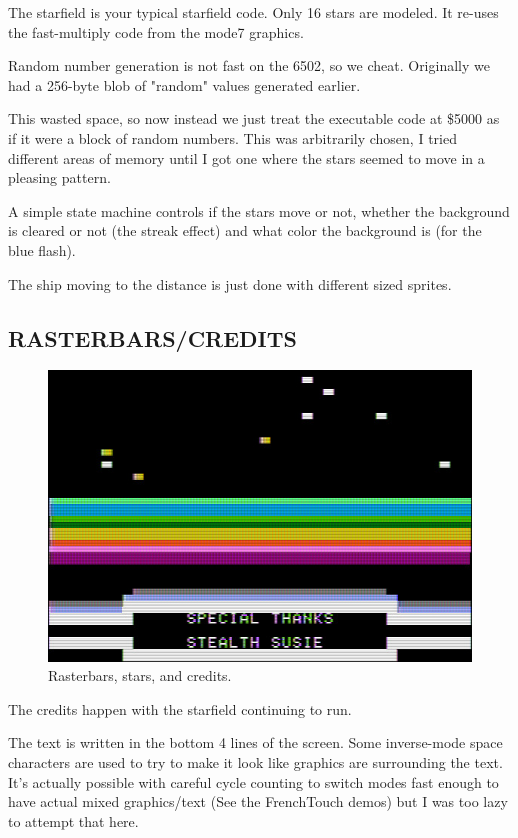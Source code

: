 \documentclass[twocolumn]{article}
\begin{document}
  The starfield is your typical starfield code.  Only 16 stars are modeled.
  It re-uses the fast-multiply code from the mode7 graphics.

  Random number generation is not fast on the 6502, so we cheat.
  Originally we had a 256-byte blob of "random" values generated earlier.

  This wasted space, so now instead we just treat the executable code
  at \$5000 as if it were a block of random numbers.  This was arbitrarily
  chosen, I tried different areas of memory until I got one where the
  stars seemed to move in a pleasing pattern.

  A simple state machine controls if the stars move or not, whether the
  background is cleared or not (the streak effect) and what color the
  background is (for the blue flash).

  The ship moving to the distance is just done with different sized sprites.

\subsection{RASTERBARS/CREDITS}

\begin{figure}[tb]
\begin{center}
\includegraphics[width=\columnwidth]{figures/m7_screen2.jpg}
\end{center}
\caption{Rasterbars, stars, and credits.\label{fig:credits}}
\end{figure}


  The credits happen with the starfield continuing to run.

  The text is written in the bottom 4 lines of the screen.  Some inverse-mode
  space characters are used to try to make it look like graphics are surrounding
  the text.  It's actually possible with careful cycle counting to switch
  modes fast enough to have actual mixed graphics/text (See the FrenchTouch
  demos) but I was too lazy to attempt that here.
\end{document}
